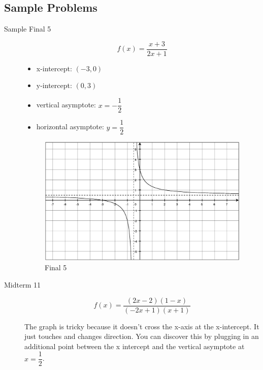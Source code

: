 \documentclass[fleqn,addpoints]{exam}
\begin{document}
\subsection{Sample Problems}
\begin{description}
\item[Sample Final 5]
\[
  f(x) = \frac{x+3}{2x+1}
\]

\begin{itemize}
  \item x-intercept: $(-3, 0)$
  \item y-intercept: $(0, 3)$
  \item vertical asymptote: $x = -\dfrac{1}{2}$
  \item horizontal asymptote: $y = \dfrac{1}{2}$
\end{itemize}

\begin{figure}[H]
  \centering
  \includegraphics[scale=.5]{final_5.eps}
  \caption*{Final 5}
\end{figure}

\item[Midterm 11]
\[
  f(x) = \frac{(2x-2)(1-x)}{(-2x+1)(x+1)}
\]


The graph is tricky because it doesn't cross the x-axis at the x-intercept.  It just touches and changes direction.  You
can discover this by plugging in an additional point between the x intercept and the vertical asymptote at 
$x = \dfrac{1}{2}$.


\end{description}
\end{document}

